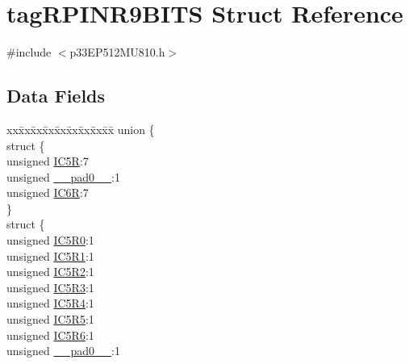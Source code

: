 \hypertarget{structtag_r_p_i_n_r9_b_i_t_s}{}\section{tag\+R\+P\+I\+N\+R9\+B\+I\+TS Struct Reference}
\label{structtag_r_p_i_n_r9_b_i_t_s}


{\ttfamily \#include $<$p33\+E\+P512\+M\+U810.\+h$>$}

\subsection*{Data Fields}
\begin{DoxyCompactItemize}
\item 
\begin{tabbing}
xx\=xx\=xx\=xx\=xx\=xx\=xx\=xx\=xx\=\kill
union \{\\
\>struct \{\\
\>\>unsigned \hyperlink{structtag_r_p_i_n_r9_b_i_t_s_a719dae4eefaabf51c63a38d04193529e}{IC5R}:7\\
\>\>unsigned \hyperlink{structtag_r_p_i_n_r9_b_i_t_s_adf71f3d8410c1f1dbbc96680a92c49af}{\_\_pad0\_\_}:1\\
\>\>unsigned \hyperlink{structtag_r_p_i_n_r9_b_i_t_s_a64335c97a5545179a5558a22ce554455}{IC6R}:7\\
\>\} \\
\>struct \{\\
\>\>unsigned \hyperlink{structtag_r_p_i_n_r9_b_i_t_s_ad7212882fbfb7cc94ddbe60a30c2ee6e}{IC5R0}:1\\
\>\>unsigned \hyperlink{structtag_r_p_i_n_r9_b_i_t_s_a8883cd8620986f5f6bb935c8ee0ad5ee}{IC5R1}:1\\
\>\>unsigned \hyperlink{structtag_r_p_i_n_r9_b_i_t_s_af8b566b052aa66d802dba3da957d8408}{IC5R2}:1\\
\>\>unsigned \hyperlink{structtag_r_p_i_n_r9_b_i_t_s_a5c598573ca4cc9990d86bcff4a0b627f}{IC5R3}:1\\
\>\>unsigned \hyperlink{structtag_r_p_i_n_r9_b_i_t_s_a185ac66e27271bbd9d1fe8f8a3126f4b}{IC5R4}:1\\
\>\>unsigned \hyperlink{structtag_r_p_i_n_r9_b_i_t_s_a141c1c4f87f2485c5b5374e1a64f7ccf}{IC5R5}:1\\
\>\>unsigned \hyperlink{structtag_r_p_i_n_r9_b_i_t_s_a67924af7313436b1466d3be4b0eeb928}{IC5R6}:1\\
\>\>unsigned \hyperlink{structtag_r_p_i_n_r9_b_i_t_s_adf71f3d8410c1f1dbbc96680a92c49af}{\_\_pad0\_\_}:1\\

\end{tabbing}
\end{DoxyCompactItemize}
